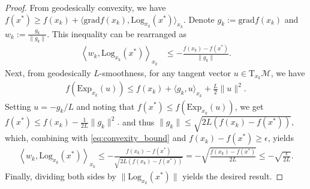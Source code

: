 \documentclass[10pt,a4paper]{amsart}
\newcommand{\Log}{\mathrm{Log}}
\newcommand{\rgrad}{\mathrm{grad}}
\begin{document}
\begin{proof}
From geodesically convexity, we have
$
f(x^*) \geq f(x_k) + \langle \rgrad f(x_k), \Log_{x_k}(x^*) \rangle_{x_k}.
$
Denote $g_k:=\rgrad f(x_k)$ and $w_k :=\frac{g_k}{\|g_k\|}$. 
This inequality can be rearranged as
\begin{align}\label{eq:convexity_bound}
\left\langle w_{k}, \Log_{x_k}(x^*)\right\rangle_{x_k} 
&\leq -\frac{f(x_k) - f(x^*)}{\|g_{k}\|} .
\end{align}
Next, from geodesically ${L}$-smoothness, for any tangent vector $u \in \mathrm{T}_{x_k}\mathcal{M}$, we have
\begin{align*}
f(\mathrm{Exp}_{x_k}(u)) \leq f(x_k) + \langle g_k, u \rangle_{x_k} + \frac{L}{2}\|u\|^2.
\end{align*}
Setting $u = -g_k/L$ and noting that $f(x^*) \leq f(\mathrm{Exp}_{x_k}(u))$, we get
$
f(x^*) \leq f(x_k) - \frac{1}{2L}\|g_k\|^2.
$
and thus 
$
\|g_{k}\| \leq \sqrt{2{L}\left(f(x_k) - f(x^*)\right)},
$
which, combining with \eqref{eq:convexity_bound} and $f(x_k) - f(x^*) \geq \epsilon$, yields
\begin{align*}
\left\langle w_{k}, \Log_{x_k}(x^*) \right\rangle_{x_k} 
\leq -\frac{f(x_k) - f(x^*)}{\sqrt{2{L}(f(x_k) - f(x^*))}} = -\sqrt{\frac{f(x_k) - f(x^*)}{2{L}}} \leq -\sqrt{\frac{ \epsilon}{2{L}}}.
\end{align*}
Finally, dividing both sides by $\|\Log_{x_k}(x^*)\|$ yields the desired result. 
\end{proof}
\end{document}
